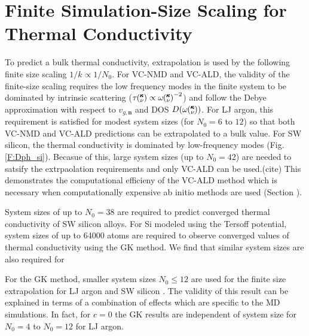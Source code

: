 \documentclass[aps,prb,onecolumn,preprint,superscriptaddress,amsmath,amssymb,floatfix]{revtex4}
\newcommand{\kv}{\mspace{-4.0mu}\left(\mspace{-8.0mu}
\begin{smallmatrix}&\pmb{\kappa} \\&\nu\end{smallmatrix}
\mspace{-3.0mu}\right)}
\begin{document}
\section{\label{A:Finite Simulation}
Finite Simulation-Size Scaling for Thermal 
Conductivity}
To predict a bulk thermal conductivity, extrapolation is used by the 
following finite size scaling $ 1 / k \propto 1/N_0$. For VC-NMD and 
VC-ALD, the validity of the finite-size scaling 
requires the low frequency modes in the finite system to be dominated by 
intrinsic scattering ($\tau\kv \propto \omega\kv^{-2}$) and  
follow the Debye approximation 
with respect to $v_{g,\mathbf{n}}$ and DOS $D(\omega\kv)$.
\cite{shiomi_thermal_2011,esfarjani_heat_2011} For LJ 
argon, this requirement is satisfied for modest system sizes 
(for $N_0 = 6$ to $12$) so that both VC-NMD and VC-ALD predictions 
can be extrapolated to a bulk value. 
For SW silicon, the thermal conductivity is dominated by low-frequency 
modes (Fig. \ref{F:Dph_si}). Becasue of this, large system sizes 
(up to $N_0 = 42$) are needed to satsify the 
extrpaolation requirements and only VC-ALD can be used.(cite) This 
demonstrates the computational efficieny of the VC-ALD method which is 
necessary when computationally expensive 
ab initio methods are used (Section ).
\cite{garg_role_2011,tian_phonon_2012,
lindsay_thermal_2012,esfarjani_heat_2011}

System sizes of up to $N_0=38$ are required to predict converged 
thermal conductivity of SW silicon alloys. 
For Si modeled using the Tersoff potential, 
system sizes of up to 64000 atoms are required to observe 
converged values of thermal conductivity using the GK method.
\cite{he_lattice_2012} We find that similar system sizes are 
also required for 

For the GK method, smaller system sizes $N_0 \le 12$ are used for the 
finite size extrapolation for LJ argon and SW silicon . 
The validity of this result can be explained in terms of a 
combination of effects which are specific to the MD simulations.
\cite{esfarjani_heat_2011} In fact, for $c=0$ the GK results are 
independent of system size for $N_0 = 4$ to $N_0 = 12$ for LJ argon.

\clearpage

%

\end{document}
